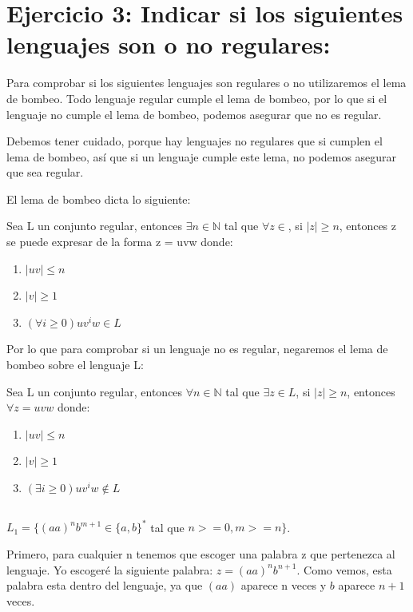 \documentclass[12pt, spanish]{article}
\begin{document}
\newpage

\section{Ejercicio 3: Indicar si los siguientes lenguajes son o no regulares:}

Para comprobar si los siguientes lenguajes son regulares o no utilizaremos el lema de bombeo. Todo lenguaje regular cumple el lema de bombeo, por lo que si el lenguaje no cumple el lema de bombeo, podemos asegurar que no es regular.

Debemos tener cuidado, porque hay lenguajes no regulares que si cumplen el lema de bombeo, así que si un lenguaje cumple este lema, no podemos asegurar que sea regular.

El lema de bombeo dicta lo siguiente:

Sea L un conjunto regular, entonces $\exists n \in \mathbb{N}$ tal que $\forall z \in $, si $|z| \geq n$, entonces z se puede expresar de la forma z = uvw donde:

\begin{enumerate}
	\item $|uv| \leq n$
	\item $|v| \geq 1$
	\item $(\forall i \geq 0) uv^iw \in L$
\end{enumerate} 


Por lo que para comprobar si un lenguaje no es regular, negaremos el lema de bombeo sobre el lenguaje L:

Sea L un conjunto regular, entonces $\forall n \in \mathbb{N}$ tal que $\exists z \in L$, si $|z| \geq n$, entonces $\forall z = uvw$ donde:


\begin{enumerate}
	\item $|uv| \leq n$
	\item $|v| \geq 1$
	\item $(\exists i \geq 0) uv^iw \not \in L$
\end{enumerate} 


\subsection{}
 $L_1 = \{ (aa)^nb^{m+1} \in \{a,b\}^* $ tal que  $n >= 0, m >= n\}$.


Primero, para cualquier n tenemos que escoger una palabra z que pertenezca al lenguaje. Yo escogeré la siguiente palabra: $z = (aa)^nb^{n+1}$. Como vemos, esta palabra esta dentro del lenguaje, ya que $(aa)$ aparece n veces y $b$ aparece $n+1$ veces.
\end{document}
